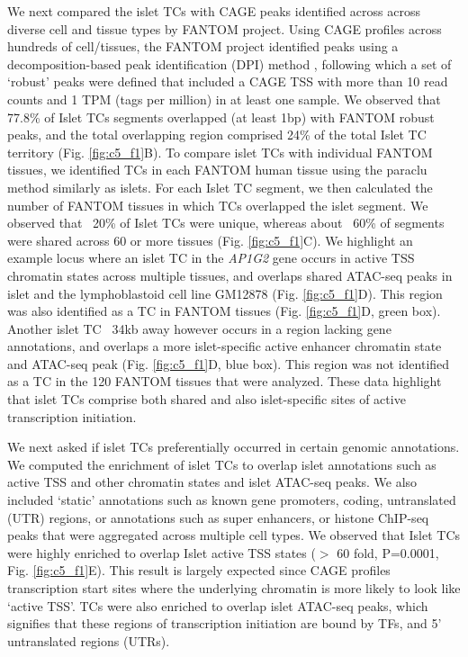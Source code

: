 We next compared the islet TCs with CAGE peaks identified across across diverse cell and tissue types by FANTOM project. Using CAGE profiles across hundreds of cell/tissues, the FANTOM project identified peaks using a decomposition-based peak identification (DPI) method \cite{thefantomconsortiumPromoterlevelMammalianExpression2014}, following which a set of ‘robust’ peaks were defined that included a CAGE TSS with more than 10 read counts and 1 TPM (tags per million) in at least one sample. We observed that 77.8\% of Islet TCs segments overlapped (at least 1bp) with FANTOM robust peaks, and the total overlapping region comprised 24\% of the total Islet TC territory (Fig. \ref{fig:c5_f1}B). To compare islet TCs with individual FANTOM tissues, we identified TCs in each FANTOM human tissue using the paraclu method similarly as islets. For each Islet TC segment, we then calculated the number of FANTOM tissues in which TCs overlapped the islet segment. We observed that ~20\% of Islet TCs were unique, whereas about ~60\% of segments were shared across 60 or more  tissues (Fig. \ref{fig:c5_f1}C). We highlight an example locus where an islet TC in the \textit{AP1G2} gene occurs in active TSS chromatin states across multiple tissues, and overlaps shared ATAC-seq peaks in islet and the lymphoblastoid cell line GM12878 \cite{buenrostroTranspositionNativeChromatin2013} (Fig. \ref{fig:c5_f1}D). This region was also identified as a TC in FANTOM tissues (Fig. \ref{fig:c5_f1}D, green box). Another islet TC ~34kb away however occurs in a region lacking gene annotations, and overlaps a more islet-specific active enhancer chromatin state and ATAC-seq peak (Fig. \ref{fig:c5_f1}D, blue box). This region was not identified as a TC in the 120 FANTOM tissues that were analyzed. These data highlight that islet TCs comprise both shared and also islet-specific sites of active transcription initiation.   


We next asked if islet TCs preferentially occurred in certain genomic annotations. We computed the enrichment of islet TCs to overlap islet annotations such as active TSS and other chromatin states and islet ATAC-seq peaks. We also included ‘static’ annotations such as known gene promoters, coding, untranslated (UTR) regions, or annotations such as super enhancers, or histone ChIP-seq peaks that were aggregated across multiple cell types. We observed that Islet TCs were highly enriched to overlap Islet active TSS states ($>$ 60 fold, P=0.0001, Fig. \ref{fig:c5_f1}E). This result is largely expected since CAGE profiles transcription start sites where the underlying chromatin is more likely to look like ‘active TSS’. TCs were also enriched to overlap islet ATAC-seq peaks, which signifies that these regions of transcription initiation are bound by TFs, and 5’ untranslated regions (UTRs). 



